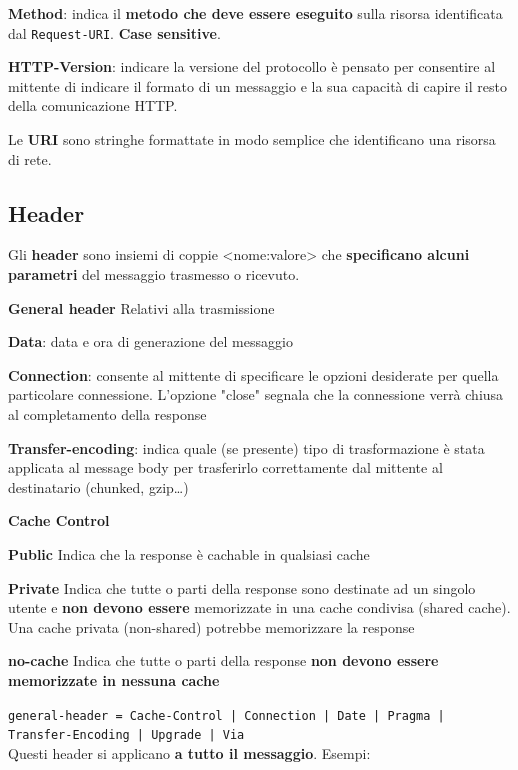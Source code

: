\documentclass[10pt]{article}
\begin{document}
\begin{list}{}{}
\item \textbf{Method}: indica il \textbf{metodo che deve essere eseguito} sulla risorsa identificata dal \texttt{Request-URI}. \textbf{Case sensitive}.
\item \textbf{HTTP-Version}: indicare la versione del protocollo è pensato per consentire al mittente di indicare il formato di un messaggio e la sua capacità di capire il resto della comunicazione HTTP.
\item Le \textbf{URI} sono stringhe formattate in modo semplice che identificano una risorsa di rete.
\subsection{Header}
Gli \textbf{header} sono insiemi di coppie <nome:valore> che \textbf{specificano alcuni parametri} del messaggio trasmesso o ricevuto.
\begin{list}{}{}
\item \textbf{General header} Relativi alla trasmissione
\begin{list}{}{}
\item \textbf{Data}: data e ora di generazione del messaggio
\item \textbf{Connection}: consente al mittente di specificare le opzioni desiderate per quella particolare connessione. L'opzione "close" segnala che la connessione verrà chiusa al completamento della response
\item \textbf{Transfer-encoding}: indica quale (se presente) tipo di trasformazione è stata applicata al message body per trasferirlo correttamente dal mittente al destinatario (chunked, gzip\ldots)
\item \textbf{Cache Control}
\begin{list}{}{}
\item \textbf{Public} Indica che la response è cachable in qualsiasi cache
\item \textbf{Private} Indica che tutte o parti della response sono destinate ad un singolo utente e \textbf{non devono essere} memorizzate in una cache condivisa (shared cache). Una cache privata (non-shared) potrebbe memorizzare la response
\item \textbf{no-cache} Indica che tutte o parti della response \textbf{non devono essere memorizzate in nessuna cache}
\end{list}
\end{list}
\texttt{general-header = Cache-Control | Connection | Date | Pragma | Transfer-Encoding | Upgrade | Via}\\Questi header si applicano \textbf{a tutto il messaggio}. Esempi:

\end{list}
\end{list}
\end{document}

